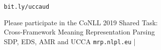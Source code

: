 \documentclass[extrafontsizes,60pt,twocolumn]{memoir}
\begin{document}
\begin{center}
\LARGE\texttt{bit.ly/{\color{blue}ucca}{\color{red}ud}}
\end{center}

\begin{minipage}{.4\columnwidth}
\color{DarkSlateGray}
\tiny
\setlength\bibitemsep{0pt}


\end{minipage}
\hspace{1in}
\begin{minipage}{.475\columnwidth}
\color{Black}
\begin{adjustbox}{margin=3mm,padding=9mm,frame,minipage=1.15\columnwidth}
\centering\Large
Please participate in the CoNLL 2019 Shared Task: \\
Cross-Framework Meaning Representation Parsing \\
\quad SDP, EDS, AMR and UCCA \hfill
\Large\texttt{{\color{violet}mrp}.{\color{red}nlpl}.{\color{blue}eu}}
\hfill {\color{white}|}
\end{adjustbox}
\end{minipage}
\end{document}
